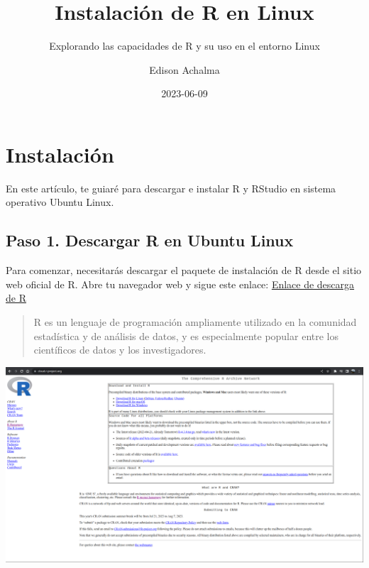 \documentclass[
  a4paper,
]{article}
\title{Instalación de R en Linux}
\subtitle{Explorando las capacidades de R y su uso en el entorno Linux}
\author{Edison Achalma}
\date{2023-06-09}
\begin{document}
\maketitle
\ifdefined\Shaded\renewenvironment{Shaded}{\begin{tcolorbox}[boxrule=0pt, interior hidden, sharp corners, borderline west={3pt}{0pt}{shadecolor}, enhanced, frame hidden, breakable]}{\end{tcolorbox}}\fi

\hypertarget{instalaciuxf3n}{%
\section{Instalación}\label{instalaciuxf3n}}

En este artículo, te guiaré para descargar e instalar R y RStudio en
sistema operativo Ubuntu Linux.

\hypertarget{paso-1.-descargar-r-en-ubuntu-linux}{%
\subsection{Paso 1. Descargar R en Ubuntu
Linux}\label{paso-1.-descargar-r-en-ubuntu-linux}}

Para comenzar, necesitarás descargar el paquete de instalación de R
desde el sitio web oficial de R. Abre tu navegador web y sigue este
enlace: \href{https://cloud.r-project.org/}{Enlace de descarga de R}

\begin{quote}
R es un lenguaje de programación ampliamente utilizado en la comunidad
estadística y de análisis de datos, y es especialmente popular entre los
científicos de datos y los investigadores.
\end{quote}

\includegraphics{images/Screenshot_20230610_222900.png}
\end{document}
